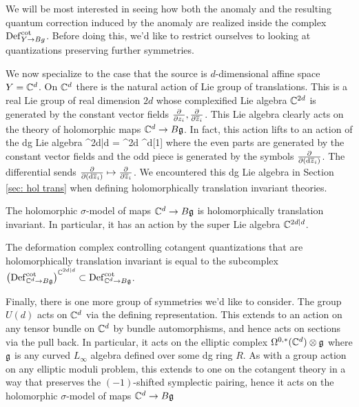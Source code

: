 \documentclass[10pt]{amsart}
\begin{document}
We will be most interested in seeing how both the anomaly and the resulting quantum correction induced by the anomaly are realized inside the complex ${\rm Def}_{Y \to Bg}^{\rm cot}$. 
Before doing this, we'd like to restrict ourselves to looking at quantizations preserving further symmetries. 

We now specialize to the case that the source is $d$-dimensional affine space $Y = \mathbb C^d$.
On $\mathbb C^d$ there is the natural action of Lie group of translations. 
This is a real Lie group of real dimension $2d$ whose complexified Lie algebra $\mathbb C^{2d}$ is generated by the constant vector fields $\frac{\partial}{\partial z_i}, \frac{\partial}{\partial \overline{z}_i}$.
This Lie algebra clearly acts on the theory of holomorphic maps $\mathbb C^{d} \to B \mathfrak g$.
In fact, this action lifts to an action of the dg Lie algebra
\ben
\CC^{2d|d} = \CC^{2d} \oplus \CC^d[1]
\een
where the even parts are generated by the constant vector fields and the odd piece is generated by the symbols $\frac{\partial}{\partial ({\rm d} \overline{z}_i)}$. 
The differential sends $\frac{\partial}{\partial ({\rm d} \overline{z}_i)} \mapsto \frac{\partial}{\partial \overline{z}_i}$.
We encountered this dg Lie algebra in Section \ref{sec: hol trans} when defining holomorphically translation invariant theories.

\begin{lem}
The holomorphic $\sigma$-model of maps $\mathbb C^d \to B \mathfrak g$ is holomorphically translation invariant. 
In particular, it has an action by the super Lie algebra $\mathbb C^{2d|d}$. 
\end{lem}

The deformation complex controlling cotangent quantizations that are holomorphically translation invariant is equal to the subcomplex $\left({\rm Def}_{\mathbb C^d \to B \mathfrak g}^{\rm cot}\right)^{\mathbb C^{2d|d}} \subset {\rm Def}^{\rm cot}_{\mathbb C^d \to B \mathfrak g}$. 

Finally, there is one more group of symmetries we'd like to consider.
The group $U(d)$ acts on $\mathbb C^d$ via the defining representation.
This extends to an action on any tensor bundle on $\mathbb C^d$ by bundle automorphisms, and hence acts on sections via the pull back. 
In particular, it acts on the elliptic complex $\Omega^{0,*}(\mathbb C^d) \otimes \mathfrak g$ where $\mathfrak g$ is any curved $L_\infty$ algebra defined over some dg ring $R$. 
As with a group action on any elliptic moduli problem, this extends to one on the cotangent theory in a way that preserves the $(-1)$-shifted symplectic pairing, hence it acts on the holomorphic $\sigma$-model of maps $\mathbb C^d \to B \mathfrak g$
\end{document}
